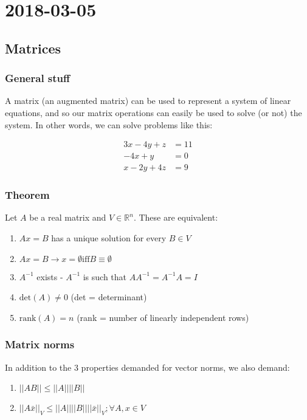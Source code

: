 \section{2018-03-05}

\subsection{Matrices}

\subsubsection{General stuff}

A matrix (an augmented matrix) can be used to represent a system of linear equations, and so our matrix operations can easily be used to solve (or not) the system. In other words, we can solve problems like this:

\begin{align*}
  3x -  4y + z  &= 11 \\
  -4x + y       &= 0 \\
  x -   2y + 4z &= 9
\end{align*}

\subsubsection{Theorem}

Let $A$ be a real matrix and $V \in \mathbb{R}^n$. These are equivalent:

\begin{enumerate}
  \item $Ax = B$ has a unique solution for every $B \in V$
  \item $Ax = B \rightarrow x = \emptyset \text{iff} B \equiv \emptyset$
  \item $A^{-1}$ exists - $A^{-1}$ is such that $AA^{-1} = A^{-1}A = I$
  \item $\text{det}(A) \neq 0$ (det = determinant)
  \item $\text{rank}(A) = n$ (rank = number of linearly independent rows)
\end{enumerate}

\subsubsection{Matrix norms}

In addition to the 3 properties demanded for vector norms, we also demand:

\begin{enumerate}
  \item $||AB|| \leq ||A|| ||B||$
  \item $||A\bar{x}||_V \leq ||A|| ||B|| ||\bar{x}||_V; \forall A, x \in V$
\end{enumerate}

